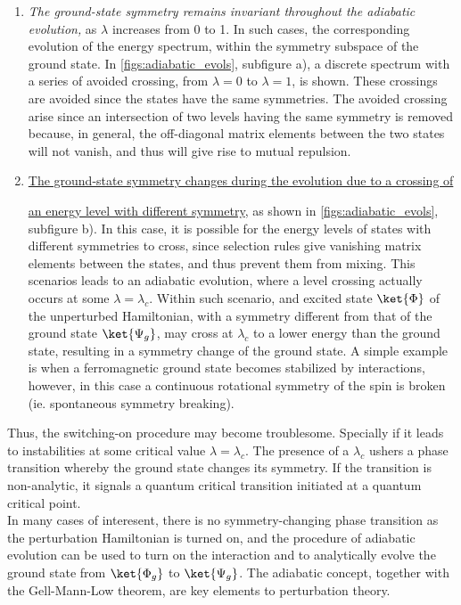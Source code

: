\begin{enumerate}
    \item \textit{The ground-state symmetry remains invariant throughout the adiabatic evolution, } as $\lambda$ increases from 0 to 1. In such cases, the corresponding evolution of the energy spectrum, within the symmetry subspace of the ground state. In \cref{figs:adiabatic_evols}, subfigure a), a discrete spectrum with a series of avoided crossing, from $\lambda = 0$ to $\lambda = 1$, is shown. These crossings are avoided since the states have the same symmetries. The avoided crossing arise since an intersection of two levels having the same symmetry is removed because, in general, the off-diagonal matrix elements between the two states will not vanish, and thus will give rise to mutual repulsion. 
    \item \underline{The ground-state symmetry changes during the evolution due to a crossing of}
    
    \underline{ an energy level with different symmetry}, as shown in \cref{figs:adiabatic_evols}, subfigure b). In this case, it is possible for the energy levels of states with different symmetries to cross, since selection rules give vanishing matrix elements between the states, and thus prevent them from mixing. This scenarios leads to an adiabatic evolution, where a level crossing actually occurs at some $\lambda = \lambda_c$. Within such scenario, and excited state $\ket{\Phi}$ of the unperturbed Hamiltonian, with a symmetry different from that of the ground state $\ket{\Psi_g}$, may cross at $\lambda_c$ to a lower energy than the ground state, resulting in a symmetry change of the ground state. A simple example is when a ferromagnetic ground state becomes stabilized by interactions, however, in this case a continuous rotational symmetry of the spin is broken (ie. spontaneous symmetry breaking).  \\ 
\end{enumerate}

Thus, the switching-on procedure may become troublesome. Specially if it leads to instabilities at some critical value $\lambda = \lambda_c$. The presence of a $\lambda_c$ ushers a phase transition whereby the ground state changes its symmetry. If the transition is non-analytic, it signals a quantum critical transition initiated at a quantum critical point. \\

In many cases of interesent, there is no symmetry-changing phase transition as the perturbation Hamiltonian is turned on, and the procedure of adiabatic evolution can be used to turn on the interaction and to analytically evolve the ground state from $\ket{\Phi_g}$ to $\ket{\Psi_g}$. The adiabatic concept, together with the Gell-Mann-Low theorem, are key elements to perturbation theory. \\


